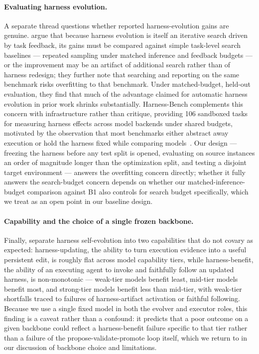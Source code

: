 \documentclass{article}
\begin{document}
\paragraph{Evaluating harness evolution.}
A separate thread questions whether reported harness-evolution gains are genuine. \citet{wang2026rethinkeval} argue that because harness evolution is itself an iterative search driven by task feedback, its gains must be compared against simple task-level search baselines --- repeated sampling under matched inference and feedback budgets --- or the improvement may be an artifact of additional search rather than of harness redesign; they further note that searching and reporting on the same benchmark risks overfitting to that benchmark. Under matched-budget, held-out evaluation, they find that much of the advantage claimed for automatic harness evolution in prior work shrinks substantially. Harness-Bench complements this concern with infrastructure rather than critique, providing 106 sandboxed tasks for measuring harness effects across model backends under shared budgets, motivated by the observation that most benchmarks either abstract away execution or hold the harness fixed while comparing models~\citep{yao2026harnessbench}. Our design --- freezing the harness before any test split is opened, evaluating on source instances an order of magnitude longer than the optimization split, and testing a disjoint target environment --- answers the overfitting concern directly; whether it fully answers the search-budget concern depends on whether our matched-inference-budget comparison against B1 also controls for search budget specifically, which we treat as an open point in our baseline design.

\paragraph{Capability and the choice of a single frozen backbone.}
Finally, \citet{lin2026disentangling} separate harness self-evolution into two capabilities that do not covary as expected: harness-updating, the ability to turn execution evidence into a useful persistent edit, is roughly flat across model capability tiers, while harness-benefit, the ability of an executing agent to invoke and faithfully follow an updated harness, is non-monotonic --- weak-tier models benefit least, mid-tier models benefit most, and strong-tier models benefit less than mid-tier, with weak-tier shortfalls traced to failures of harness-artifact activation or faithful following. Because we use a single fixed model in both the evolver and executor roles, this finding is a caveat rather than a confound: it predicts that a poor outcome on a given backbone could reflect a harness-benefit failure specific to that tier rather than a failure of the propose-validate-promote loop itself, which we return to in our discussion of backbone choice and limitations.
\end{document}
